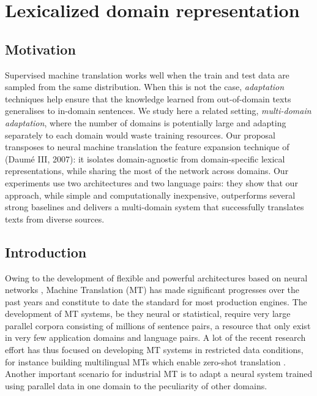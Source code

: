 \chapter{Lexicalized domain representation}
\section{Motivation}
  Supervised machine translation works well when the train and test data are sampled from the same distribution.
  When this is not the case, \emph{adaptation} techniques help ensure that the knowledge learned from out-of-domain texts generalises to in-domain sentences.
  We study here a related setting, \emph{multi-domain adaptation}, where the number of domains is potentially large and adapting separately to each domain would waste training resources.
  Our proposal transposes to neural machine translation the feature expansion technique of (Daum\'e III, 2007): it isolates domain-agnostic from domain-specific lexical representations, while sharing the most of the network across domains.
  Our experiments use two architectures and two language pairs: they show that our approach, while simple and computationally inexpensive, outperforms several strong baselines and delivers a multi-domain system that successfully translates texts from diverse sources.

\section{Introduction \label{sec:introduction}}
Owing to the development of flexible and powerful architectures based on neural networks \cite{Cho14properties,Bahdanau15learning,Ghering17convolutional,Vaswani17attention}, 
Machine Translation (MT) has made significant progresses over the past years and constitute to date the standard for most production engines. 
The development of MT systems, be they neural or statistical, require very large parallel corpora consisting of millions of sentence pairs, a resource that only exist in very few application domains and language pairs. 
A lot of the recent research effort has thus focused on developing MT systems in restricted data conditions, for instance building multilingual MTs which enable zero-shot translation \cite{Firat16multiway,Ha16towards,Johnson17google}.
Another important scenario for industrial MT is to adapt a neural system trained using parallel data in one domain to the peculiarity of other domains. 

